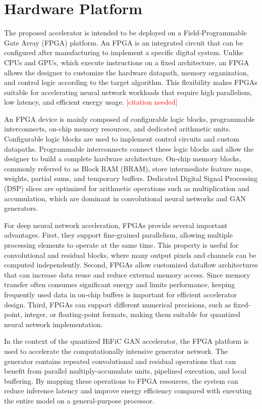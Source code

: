 \documentclass[11pt]{report}
\begin{document}
\section{Hardware Platform}

The proposed accelerator is intended to be deployed on a Field-Programmable Gate Array (FPGA) platform. An FPGA is an integrated circuit that can be configured after manufacturing to implement a specific digital system. Unlike CPUs and GPUs, which execute instructions on a fixed architecture, an FPGA allows the designer to customize the hardware datapath, memory organization, and control logic according to the target algorithm. This flexibility makes FPGAs suitable for accelerating neural network workloads that require high parallelism, low latency, and efficient energy usage. \textcolor{red}{[citation needed]}

An FPGA device is mainly composed of configurable logic blocks, programmable interconnects, on-chip memory resources, and dedicated arithmetic units. Configurable logic blocks are used to implement control circuits and custom datapaths. Programmable interconnects connect these logic blocks and allow the designer to build a complete hardware architecture. On-chip memory blocks, commonly referred to as Block RAM (BRAM), store intermediate feature maps, weights, partial sums, and temporary buffers. Dedicated Digital Signal Processing (DSP) slices are optimized for arithmetic operations such as multiplication and accumulation, which are dominant in convolutional neural networks and GAN generators.

For deep neural network acceleration, FPGAs provide several important advantages. First, they support fine-grained parallelism, allowing multiple processing elements to operate at the same time. This property is useful for convolutional and residual blocks, where many output pixels and channels can be computed independently. Second, FPGAs allow customized dataflow architectures that can increase data reuse and reduce external memory access. Since memory transfer often consumes significant energy and limits performance, keeping frequently used data in on-chip buffers is important for efficient accelerator design. Third, FPGAs can support different numerical precisions, such as fixed-point, integer, or floating-point formats, making them suitable for quantized neural network implementation.

In the context of the quantized HiFiC GAN accelerator, the FPGA platform is used to accelerate the computationally intensive generator network. The generator contains repeated convolutional and residual operations that can benefit from parallel multiply-accumulate units, pipelined execution, and local buffering. By mapping these operations to FPGA resources, the system can reduce inference latency and improve energy efficiency compared with executing the entire model on a general-purpose processor.
\end{document}
